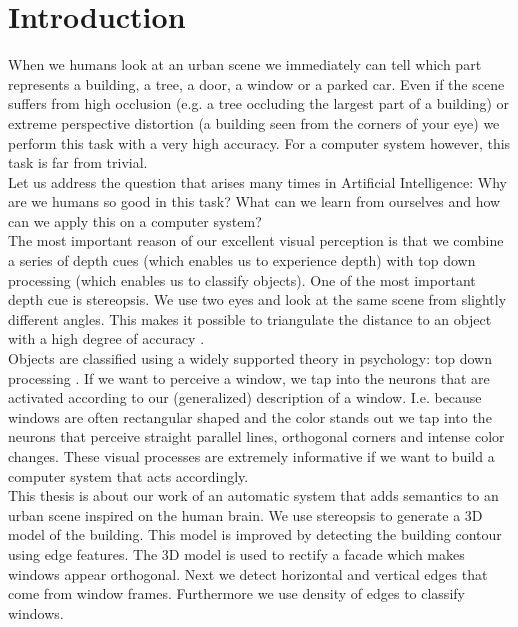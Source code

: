 \section{Introduction}
When we humans look at an urban scene we immediately can tell which part
represents a building, a tree, a door, a window or a parked car.
Even if the scene suffers from high occlusion (e.g. a tree occluding the largest part
of a building) or extreme perspective distortion (a building seen from the
corners of your eye) we perform this task with a very high accuracy.
For a computer system however, this task is far from trivial.\\

Let us address the question that arises many times in Artificial Intelligence:
Why are we humans so good in this task? What can we learn from ourselves 
and how can we apply this on a computer system?\\

The most important reason of our excellent visual perception is that we combine 
a series of depth cues \cite{psy} (which enables us to experience depth) with top down
processing (which enables us to classify objects).
One of the most important depth cue is stereopsis.  We use two eyes and look at
the same scene from slightly different angles.  This makes it possible to
triangulate the distance to an object with a high degree of accuracy
\cite{psy} \cite{hartley}. \\ 

Objects are classified using a widely supported theory in psychology: top down
processing \cite{anderson}. If we want to perceive a window, we tap into the neurons that are activated according to
our (generalized) description of a window.  I.e. because windows are often
rectangular shaped and the color stands out we tap into the neurons that
perceive straight parallel lines, orthogonal corners and intense color changes.
These visual processes are extremely informative if we want to build a computer system
that acts accordingly.  \\

This thesis is about our work of an automatic system that adds semantics to an
urban scene inspired on the human brain.  We use stereopsis to generate a 3D
model of the building. This model is improved by detecting the building contour
using edge features.  The 3D model is used to rectify a facade which makes
windows appear orthogonal.  Next we detect horizontal and vertical edges that
come from window frames.  Furthermore we use density of edges to classify
windows.\\

